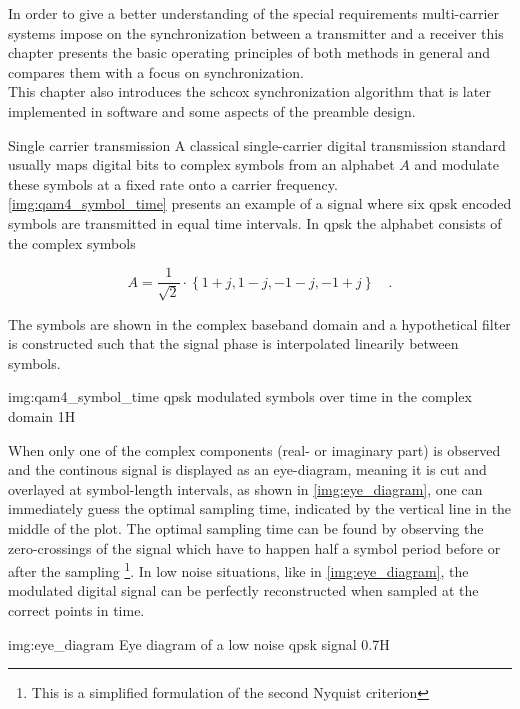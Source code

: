In order to give a better understanding of the special
requirements multi-carrier systems impose on the
synchronization between a transmitter and a receiver
this chapter presents the basic operating principles
of both methods in general and compares them with
a focus on synchronization. \\

This chapter also introduces the \acrlong{schcox}
synchronization algorithm that is later implemented
in software and some aspects of the preamble design.

\begin{subchapter}{Single carrier transmission}
  A classical single-carrier digital transmission standard
  usually maps digital bits to complex symbols from an
  alphabet $A$ and modulate these
  symbols at a fixed rate onto a carrier frequency. \\

  \autoref{img:qam4_symbol_time} presents an example of
  a signal where six \acrshort{qpsk} encoded symbols
  are transmitted in equal time intervals.
  In \acrshort{qpsk} the alphabet consists of the complex
  symbols

  \begin{equation*}
    A = \frac{1}{\sqrt{2}} \cdot \left\{ 1+j, 1-j, -1-j, -1+j \right\} \quad .
  \end{equation*}

  The symbols are shown in the complex baseband domain and a
  hypothetical filter is constructed such that the signal
  phase is interpolated linearily between symbols.

               {img:qam4_symbol_time}
               {\acrshort{qpsk} modulated symbols over time in the complex domain}
               {1}{H}

  When only one of the complex components (real- or imaginary part)
  is observed and the continous signal is displayed as an eye-diagram,
  meaning it is cut and overlayed at symbol-length
  intervals, as shown in \autoref{img:eye_diagram}, one can
  immediately guess the optimal sampling time, indicated by the
  vertical line in the middle of the plot.
  The optimal sampling time can be found by observing the
  zero-crossings of the signal which have to happen half a
  symbol period before or after the sampling
  \footnote{This is a simplified formulation of the second Nyquist criterion}.
  In low noise situations, like in \autoref{img:eye_diagram},
  the modulated digital signal can be perfectly reconstructed
  when sampled at the correct points in time.

                  {img:eye_diagram}
                  {Eye diagram of a low noise \acrshort{qpsk} signal}
                  {0.7}{H}
\end{subchapter}

